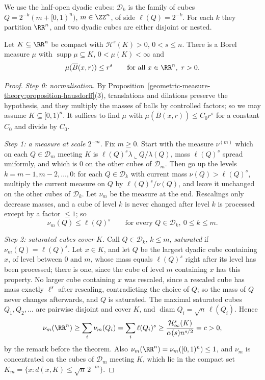 We use the half-open dyadic cubes: $\mathcal{D}_k$ is the family of cubes $Q = 2^{-k}(m + [0, 1)^n)$, $m \in \ZZ^n$, of side $\ell(Q) = 2^{-k}$. For each $k$ they partition $\RR^n$, and two dyadic cubes are
either disjoint or nested.

\begin{theorem}\label{geometric-measure-theory:theorem-frostman}
Let $K \subseteq \RR^n$ be compact with $\mathcal{H}^s(K) > 0$, $0 < s \leq n$. There is a Borel measure $\mu$ with $\operatorname{supp}\mu \subseteq K$, $0 < \mu(K) < \infty$ and
\[
\mu(\overline{B}(x, r)) \leq r^s \qquad \text{for all } x \in \RR^n,\ r > 0 .
\]
\end{theorem}

\begin{proof}
\emph{Step 0: normalisation.} By Proposition~\ref{geometric-measure-theory:proposition-hausdorff}(3), translations and dilations preserve the hypothesis, and they multiply the masses of balls by
controlled factors; so we may assume $K \subseteq [0, 1)^n$. It suffices to find $\mu$ with $\mu(\overline{B}(x, r)) \leq C_0r^s$ for a constant $C_0$ and divide by $C_0$.

\emph{Step 1: a measure at scale $2^{-m}$.} Fix $m \geq 0$. Start with the measure $\nu^{(m)}$ which on each $Q \in \mathcal{D}_m$ meeting $K$ is $\ell(Q)^s\lambda\llcorner Q/\lambda(Q)$, mass $\ell(Q)^s$ spread
uniformly, and which is $0$ on the other cubes of $\mathcal{D}_m$. Then go up the levels $k = m - 1, m - 2, \ldots, 0$: for each $Q \in \mathcal{D}_k$ with current mass $\nu(Q) > \ell(Q)^s$, multiply the current
measure on $Q$ by $\ell(Q)^s/\nu(Q)$, and leave it unchanged on the other cubes of $\mathcal{D}_k$. Let $\nu_m$ be the measure at the end. Rescalings only decrease masses, and a cube of level $k$ is
never changed after level $k$ is processed except by a factor $\leq 1$; so
\[
\nu_m(Q) \leq \ell(Q)^s \qquad \text{for every } Q \in \mathcal{D}_k,\ 0 \leq k \leq m .
\]

\emph{Step 2: saturated cubes cover $K$.} Call $Q \in \mathcal{D}_k$, $k \leq m$, \emph{saturated} if $\nu_m(Q) = \ell(Q)^s$. Let $x \in K$, and let $Q$ be the largest dyadic cube containing $x$, of level
between $0$ and $m$, whose mass equals $\ell(Q)^s$ right after its level has been processed; there is one, since the cube of level $m$ containing $x$ has this property. No larger cube containing $x$
was rescaled, since a rescaled cube has mass exactly $\ell^s$ after rescaling, contradicting the choice of $Q$; so the mass of $Q$ never changes afterwards, and $Q$ is saturated. The maximal
saturated cubes $Q_1, Q_2, \ldots$ are pairwise disjoint and cover $K$, and $\operatorname{diam}Q_i = \sqrt n\,\ell(Q_i)$. Hence
\[
\nu_m(\RR^n) \geq \sum_i\nu_m(Q_i) = \sum_i\ell(Q_i)^s \geq \frac{\mathcal{H}^s_\infty(K)}{\alpha(s)n^{s/2}} = c > 0 ,
\]
by the remark before the theorem. Also $\nu_m(\RR^n) = \nu_m([0, 1)^n) \leq 1$, and $\nu_m$ is concentrated on the cubes of $\mathcal{D}_m$ meeting $K$, which lie in the compact set
$K_m = \{x : d(x, K) \leq \sqrt n\,2^{-m}\}$.


\end{proof}
